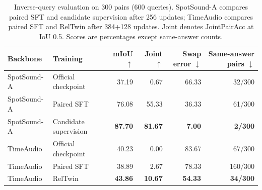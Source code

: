 \begin{table}[t]
\centering
\caption{Inverse-query evaluation on 300 pairs (600 queries). SpotSound-A compares paired SFT and candidate supervision after 256 updates; TimeAudio compares paired SFT and RelTwin after 384+128 updates. Joint denotes JointPairAcc at IoU 0.5. Scores are percentages except same-answer counts.}
\label{tab:training}
\small
\setlength{\tabcolsep}{7pt}
\begin{tabular*}{\textwidth}{@{\extracolsep{\fill}}llrrrr@{}}
\toprule
Backbone & Training & mIoU $\uparrow$ & Joint $\uparrow$ & Swap error $\downarrow$ & Same-answer pairs $\downarrow$\\
\midrule
SpotSound-A & Official checkpoint & 37.19 & 0.67 & 66.33 & 32/300\\
SpotSound-A & Paired SFT & 76.08 & 55.33 & 36.33 & 61/300\\
SpotSound-A & Candidate supervision & \textbf{87.70} & \textbf{81.67} & \textbf{7.00} & \textbf{2/300}\\
\midrule
TimeAudio & Official checkpoint & 40.23 & 0.00 & 83.67 & 67/300\\
TimeAudio & Paired SFT & 38.89 & 2.67 & 78.33 & 160/300\\
TimeAudio & RelTwin & \textbf{43.86} & \textbf{10.67} & \textbf{54.33} & \textbf{34/300}\\
\bottomrule
\end{tabular*}
\end{table}
